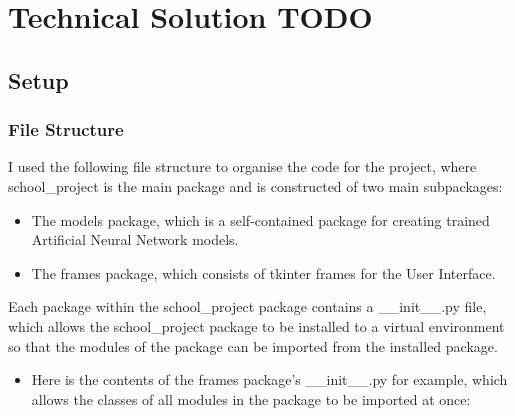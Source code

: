 \documentclass[./project-report/src/latex/project-report.tex]{subfiles}
\begin{document}
\maketitle

\section{Technical Solution TODO}

\subsection{Setup}

\subsubsection{File Structure}

I used the following file structure to organise the code for the project, where school\_project is the main package and is constructed of two main subpackages:

\begin{itemize}
    \item The models package, which is a self-contained package for creating trained Artificial Neural Network models.
    \item The frames package, which consists of tkinter frames for the User Interface.
\end{itemize}

\pagebreak

\begin{footnotesize}

\end{footnotesize}

\pagebreak

Each package within the school\_project package contains a \_\_init\_\_.py file, which allows the school\_project package to be installed to a virtual environment 
so that the modules of the package can be imported from the installed package.

\begin{itemize}
    \item Here is the contents of the frames package's \_\_init\_\_.py for example, which allows the classes of all modules in the package to be imported at once:
        \inputminted{python}{./school_project/frames/__init__.py}
\end{itemize}
\end{document}
